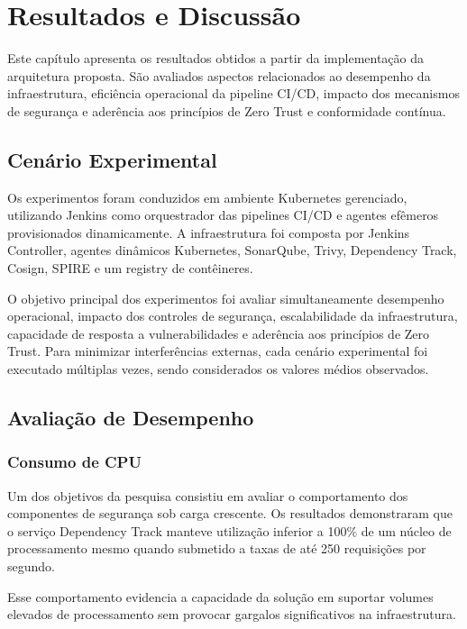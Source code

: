 \chapter{Resultados e Discussão}
\label{cap:resultados}

Este capítulo apresenta os resultados obtidos a partir da implementação da arquitetura proposta. São avaliados aspectos relacionados ao desempenho da infraestrutura, eficiência operacional da pipeline CI/CD, impacto dos mecanismos de segurança e aderência aos princípios de Zero Trust e conformidade contínua.

\section{Cenário Experimental}
\label{sec:cenario-experimental}

Os experimentos foram conduzidos em ambiente Kubernetes gerenciado, utilizando Jenkins como orquestrador das pipelines CI/CD e agentes efêmeros provisionados dinamicamente. A infraestrutura foi composta por Jenkins Controller, agentes dinâmicos Kubernetes, SonarQube, Trivy, Dependency Track, Cosign, SPIRE e um registry de contêineres.

O objetivo principal dos experimentos foi avaliar simultaneamente desempenho operacional, impacto dos controles de segurança, escalabilidade da infraestrutura, capacidade de resposta a vulnerabilidades e aderência aos princípios de Zero Trust. Para minimizar interferências externas, cada cenário experimental foi executado múltiplas vezes, sendo considerados os valores médios observados.

\section{Avaliação de Desempenho}
\label{sec:avaliacao-desempenho}

\subsection{Consumo de CPU}
\label{subsec:consumo-cpu}

Um dos objetivos da pesquisa consistiu em avaliar o comportamento dos componentes de segurança sob carga crescente. Os resultados demonstraram que o serviço Dependency Track manteve utilização inferior a 100\% de um núcleo de processamento mesmo quando submetido a taxas de até 250 requisições por segundo.

Esse comportamento evidencia a capacidade da solução em suportar volumes elevados de processamento sem provocar gargalos significativos na infraestrutura.

